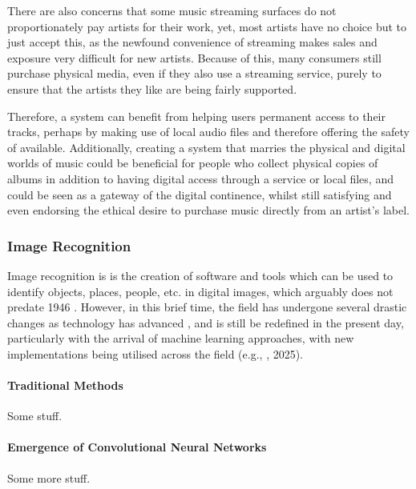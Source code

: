                 There are also concerns that some music streaming surfaces do not proportionately pay artists for their work, yet, most artists have no choice but to just accept this, as the newfound convenience of streaming makes sales and exposure very difficult for new artists. Because of this, many consumers still purchase physical media, even if they also use a streaming service, purely to ensure that the artists they like are being fairly supported.
    
                Therefore, a system can benefit from helping users permanent access to their tracks, perhaps by making use of local audio files and therefore offering the safety of available. Additionally, creating a system that marries the physical and digital worlds of music could be beneficial for people who collect physical copies of albums in addition to having digital access through a service or local files, and could be seen as a gateway of the digital continence, whilst still satisfying and even endorsing the ethical desire to purchase music directly from an artist's label.
    
        \subsubsection{Image Recognition}
    
            Image recognition is is the creation of software and tools which can be used to identify objects, places, people, etc. in digital images, which arguably does not predate 1946 \cite{hall1979computer}. However, in this brief time, the field has undergone several drastic changes as technology has advanced \cite{imagenetclasscnn}, and is still be redefined in the present day, particularly with the arrival of machine learning approaches, with new implementations being utilised across the field (e.g., \cite{RAMPRASAD2025100556}, 2025).
            
            \paragraph{Traditional Methods}
    
                Some stuff.
            
            \paragraph{Emergence of Convolutional Neural Networks}
    
                Some more stuff.
    
